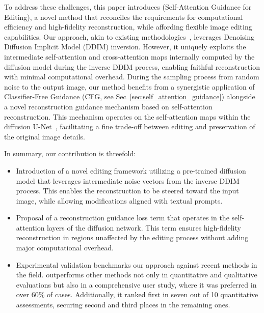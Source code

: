 To address these challenges, {\modified{}this paper introduces} \method{}  (Self-Attention Guidance for Editing), a novel method that reconciles the requirements for computational efficiency and high-fidelity reconstruction, while affording flexible image editing capabilities. Our approach, akin to existing methodologies~\cite{mokady2023null,miyake2023negative,parmar2023zero}, leverages Denoising Diffusion Implicit Model (DDIM) \cite{song2021ddim} inversion. However, it uniquely exploits the intermediate self-attention and cross-attention maps internally computed by the diffusion model during the inverse DDIM process, enabling faithful reconstruction with minimal computational overhead. During the sampling process from random noise to the output image, {\modified{}our method benefits} from a synergistic application of Classifier-Free Guidance (CFG, see Sec~\ref{sec:self_attention_guidance}) alongside a novel reconstruction guidance mechanism based on self-attention reconstruction. This mechanism operates on the self-attention maps within the diffusion U-Net~\cite{ronneberger2015unet}, facilitating a fine trade-off between editing and preservation of the original image details.

In summary, our contribution is threefold:


\begin{itemize}
    \item {\modified{}Introduction of} a novel editing framework utilizing a pre-trained diffusion model that leverages intermediate noise vectors from the inverse DDIM process. This enables the reconstruction to be steered toward the input image, while allowing modifications aligned with textual prompts.
    \item {\modified{}Proposal of} a reconstruction guidance loss term that operates in the self-attention layers of the diffusion network. This term ensures high-fidelity reconstruction in regions unaffected by the editing process without adding major computational overhead.
    \item {\modified{}Experimental validation benchmarks our approach} against recent methods in the field. \method{} outperforms other methods not only in quantitative and qualitative evaluations but also in a comprehensive user study, where it was preferred in over 60\% of cases. Additionally, it ranked first in seven out of 10 quantitative assessments, securing second and third places in the remaining ones.
\end{itemize}



